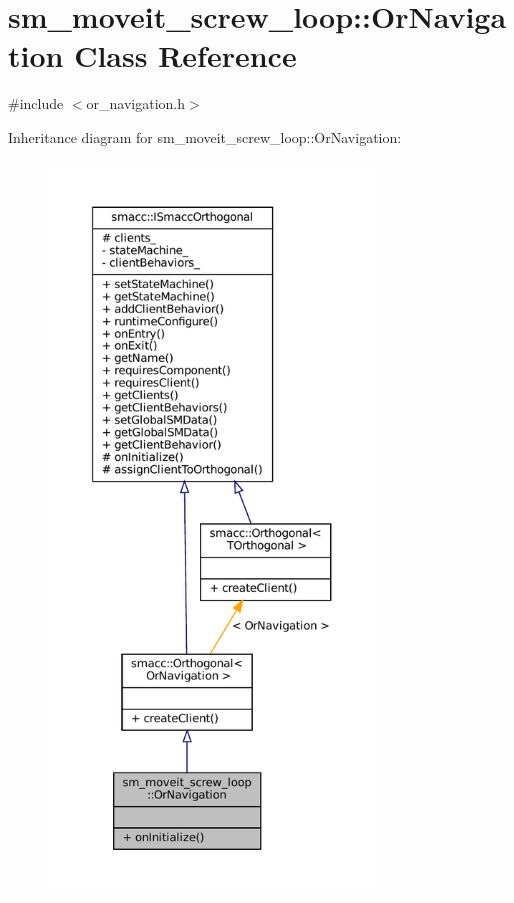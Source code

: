 \hypertarget{classsm__moveit__screw__loop_1_1OrNavigation}{}\section{sm\+\_\+moveit\+\_\+screw\+\_\+loop\+:\+:Or\+Navigation Class Reference}
\label{classsm__moveit__screw__loop_1_1OrNavigation}


{\ttfamily \#include $<$or\+\_\+navigation.\+h$>$}



Inheritance diagram for sm\+\_\+moveit\+\_\+screw\+\_\+loop\+:\+:Or\+Navigation\+:
\nopagebreak
\begin{figure}[H]
\begin{center}
\leavevmode
\includegraphics[height=550pt]{classsm__moveit__screw__loop_1_1OrNavigation__inherit__graph}
\end{center}
\end{figure}


